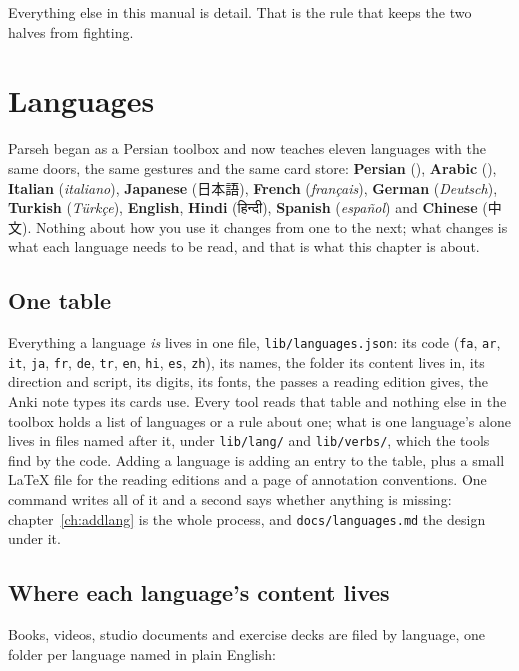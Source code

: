 \documentclass[11pt,oneside]{report}
\newcommand{\pw}[1]{\babelsublr{\mbox{\foreignlanguage{persian}{#1}}}}
\newcommand{\aw}[1]{\babelsublr{\mbox{\foreignlanguage{arabic}{#1}}}}
\newcommand{\jw}[1]{\mbox{\foreignlanguage{japanese}{#1}}}
\newcommand{\iw}[1]{\foreignlanguage{italian}{\emph{#1}}}
\newcommand{\fw}[1]{\foreignlanguage{french}{\emph{#1}}}
\newcommand{\gw}[1]{\foreignlanguage{ngerman}{\emph{#1}}}
\newcommand{\tw}[1]{\foreignlanguage{turkish}{\emph{#1}}}
\newcommand{\sw}[1]{\foreignlanguage{spanish}{\emph{#1}}}
\newcommand{\hw}[1]{\mbox{\foreignlanguage{hindi}{#1}}}
\newcommand{\cw}[1]{\mbox{\foreignlanguage{chinese}{#1}}}
\newcommand{\file}[1]{\texttt{#1}}
\begin{document}
Everything else in this manual is detail. That is the rule that keeps the
two halves from fighting.

\chapter{Languages}
\label{ch:languages}

Parseh began as a Persian toolbox and now teaches eleven languages with the
same doors, the same gestures and the same card store: \textbf{Persian}
(\pw{فارسی}), \textbf{Arabic} (\aw{العربية}), \textbf{Italian}
(\iw{italiano}), \textbf{Japanese} (\jw{日本語}), \textbf{French}
(\fw{français}), \textbf{German} (\gw{Deutsch}), \textbf{Turkish}
(\tw{Türkçe}), \textbf{English}, \textbf{Hindi} (\hw{हिन्दी}),
\textbf{Spanish} (\sw{español}) and \textbf{Chinese} (\cw{中文}).
Nothing about how you use it changes from one to the next;
what changes is what each language needs to be read, and that is what this
chapter is about.

\section{One table}

Everything a language \emph{is} lives in one file,
\file{lib/languages.json}: its code (\texttt{fa}, \texttt{ar}, \texttt{it},
\texttt{ja}, \texttt{fr}, \texttt{de}, \texttt{tr}, \texttt{en},
\texttt{hi}, \texttt{es}, \texttt{zh}), its names, the folder
its content lives in, its direction and script, its digits, its fonts, the
passes a reading edition gives, the Anki note types its cards use. Every
tool reads that table and nothing else in the toolbox holds a list of
languages or a rule about one; what is one language's alone lives in files
named after it, under \file{lib/lang/} and \file{lib/verbs/}, which the
tools find by the code. Adding a language is adding an entry to the table,
plus a small LaTeX file for the reading editions and a page of annotation
conventions. One command writes all of it and a
second says whether anything is missing: chapter~\ref{ch:addlang} is the
whole process, and \file{docs/languages.md} the design under it.

\section{Where each language's content lives}

Books, videos, studio documents and exercise decks are filed by language,
one folder per language named in plain English:
\end{document}
